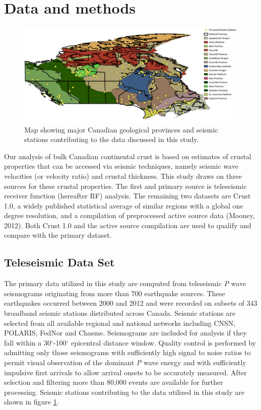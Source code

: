 \documentclass[review]{elsarticle}
\begin{document}


\section{Data and methods}


\begin{figure}
  \centering
  \includegraphics[width=\textwidth]{stationMap.pdf}
  \caption{Map showing major Canadian geological provinces and seismic stations contributing to the data discussed in this study.}
  \label{map:stationMap}
\end{figure}


Our analysis of bulk Canadian continental crust is based on estimates of crustal properties that can be accessed via seismic techniques, namely seismic wave velocities (or velocity ratio) and crustal thickness. This study draws on three sources for these crustal properties. The first and primary source is teleseismic receiver function (hereafter RF) analysis. The remaining two datasets are Crust 1.0, a widely published statistical average of similar regions with a global one degree resolution, and a compilation of preprocessed active source data (Mooney, 2012). Both Crust 1.0 and the active source compilation are used to qualify and compare with the primary dataset.


\subsection{Teleseismic Data Set}
The primary data utilized in this study are computed from teleseismic {\it P} wave seismograms originating from more than 700 earthquake sources. These earthquakes occurred between 2000 and 2012 and were recorded on subsets of 343 broadband seismic stations distributed across Canada. Seismic stations are selected from all available regional and national networks including CNSN, POLARIS, FedNor and Chasme. Seismograms are included for analysis if they fall within a 30$^\circ$-100$^\circ$ epicentral distance window. Quality control is performed by admitting only those seismograms with sufficiently high signal to noise ratios to permit visual observation of the dominant {\it P} wave energy and with sufficiently impulsive first arrivals to allow arrival onsets to be accurately measured. After selection and filtering more than 80,000 events are available for further processing. Seismic stations contributing to the data utilized in this study are shown in figure \ref{map:stationMap}.
\end{document}
